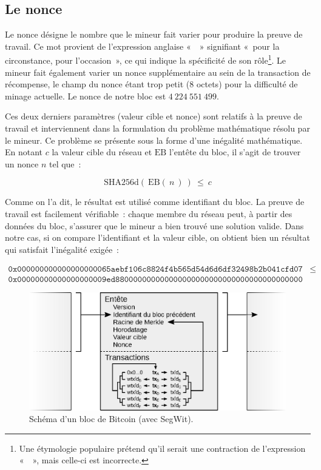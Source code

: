 
\subsection{Le nonce} Le nonce désigne le nombre que le mineur fait varier pour produire la preuve de travail. Ce mot provient de l'expression anglaise «~~» signifiant «~pour la circonstance, pour l'occasion~», ce qui indique la spécificité de son rôle\footnote{Une étymologie populaire prétend qu'il serait une contraction de l'expression «~~», mais celle-ci est incorrecte.}. Le mineur fait également varier un nonce supplémentaire au sein de la transaction de récompense, le champ du nonce étant trop petit (8 octets) pour la difficulté de minage actuelle. Le nonce de notre bloc est $4~224~551~499$.

Ces deux derniers paramètres (valeur cible et nonce) sont relatifs à la preuve de travail et interviennent dans la formulation du problème mathématique résolu par le mineur. Ce problème se présente sous la forme d'une inégalité mathématique. En notant $c$ la valeur cible du réseau et $\mathrm{EB}$ l'entête du bloc, il s'agit de trouver un nonce $n$ tel que~:

{ \footnotesize
\[
\mathrm{SHA256d} ( \ \mathrm{EB} ( \ n \ ) \ ) ~ \le ~ c
\]
}

Comme on l'a dit, le résultat est utilisé comme identifiant du bloc. La preuve de travail est facilement vérifiable~: chaque membre du réseau peut, à partir des données du bloc, s'assurer que le mineur a bien trouvé une solution valide. Dans notre cas, si on compare l'identifiant et la valeur cible, on obtient bien un résultat qui satisfait l'inégalité exigée~:

{ \footnotesize
\begin{align*}
\mathtt{0x000000000000000000065aebf106c8824f4b565d54d6d6df32498b2b041cfd07} & \le \\ \mathtt{0x00000000000000000009ed880000000000000000000000000000000000000000} & ~
\end{align*}
}

\begin{figure}[h]
  \centering
  \includegraphics[scale=0.75]{img/bitcoin-segwit-block.eps}
  \caption{Schéma d'un bloc de Bitcoin (avec SegWit).}
  \label{fig:bitcoin-segwit-block}
\end{figure}


